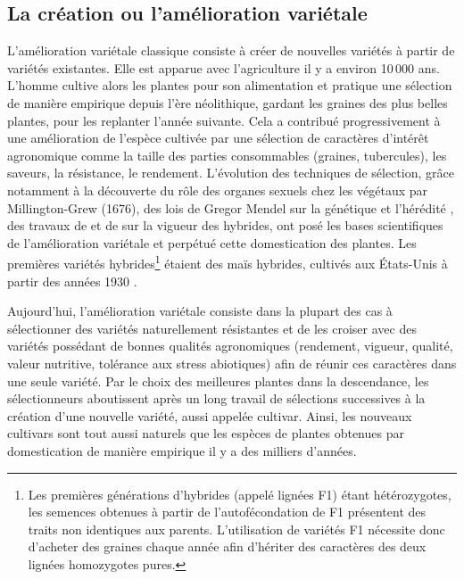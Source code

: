  
\subsection{La  création ou l'amélioration variétale}
 
	L'amélioration variétale classique consiste  à créer de nouvelles variétés à partir de variétés existantes. Elle est apparue avec l'agriculture il y a environ 10\,000 ans.
L'homme cultive alors les plantes  pour son alimentation et pratique une sélection  de manière empirique depuis l'ère néolithique, gardant les graines des plus belles plantes, pour les replanter l'année suivante.
Cela a contribué progressivement à une amélioration de l'espèce cultivée par une sélection  de caractères d'intérêt agronomique  comme la taille des parties consommables (graines, tubercules), les saveurs, la résistance, le rendement. 
L'évolution des techniques de sélection, grâce notamment à la découverte du rôle des organes sexuels chez les végétaux par  Millington-Grew (1676),  des lois  de Gregor Mendel sur la génétique  et l'hérédité \citep{Biffen1905}, des travaux de \citet{Darwin1876}   et de \citep{Shull1908} sur la vigueur des hybrides, ont posé les bases scientifiques de l'amélioration variétale et perpétué cette domestication des plantes. %
Les premières variétés hybrides\footnote{Les premières générations d'hybrides (appelé lignées F1) étant hétérozygotes, les semences obtenues à partir de l’autofécondation
de F1 présentent des traits non identiques aux parents. L’utilisation de variétés F1 nécessite donc d’acheter des graines chaque année afin d’hériter des caractères des deux lignées homozygotes pures.} étaient des maïs hybrides, cultivés aux États-Unis à partir des années 1930 \citep{Duvick2001}.
	 
	Aujourd'hui, l'amélioration variétale consiste dans la plupart des  cas  à sélectionner des variétés naturellement résistantes  et de les croiser avec des variétés possédant de bonnes qualités  agronomiques (rendement, vigueur, qualité, valeur nutritive, tolérance aux stress abiotiques) afin de réunir ces caractères dans une seule variété.
Par le choix des meilleures plantes dans la descendance, les sélectionneurs aboutissent après un long travail de sélections successives à la création d'une nouvelle variété, aussi appelée cultivar. Ainsi, les nouveaux cultivars sont tout aussi naturels que les espèces de plantes obtenues par domestication de manière empirique il y a des milliers d'années.  
	
